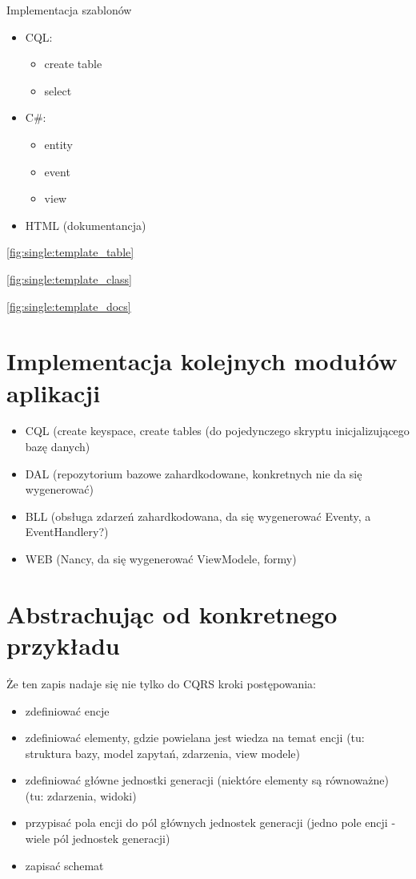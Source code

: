 Implementacja szablonów

\begin{itemize}
 \item CQL:
  \begin{itemize}
   \item create table
   \item select
  \end{itemize}
 \item C\#:
  \begin{itemize}
   \item entity
   \item event
   \item view
  \end{itemize}
 \item HTML (dokumentancja)
\end{itemize}

\ref{fig:single:template_table}


\ref{fig:single:template_class}


\ref{fig:single:template_docs}




\section{Implementacja kolejnych modułów aplikacji}

\begin{itemize}
 \item CQL (create keyspace, create tables (do pojedynczego skryptu inicjalizującego bazę danych)
 \item DAL (repozytorium bazowe zahardkodowane, konkretnych nie da się wygenerować)
 \item BLL (obsługa zdarzeń zahardkodowana, da się wygenerować Eventy, a EventHandlery?)
 \item WEB (Nancy, da się wygenerować ViewModele, formy)
\end{itemize}



\section{Abstrachując od konkretnego przykładu}

Że ten zapis nadaje się nie tylko do CQRS
kroki postępowania:

\begin{itemize}
 \item zdefiniować encje
 \item zdefiniować elementy, gdzie powielana jest wiedza na temat encji (tu: struktura bazy, model zapytań, zdarzenia, view modele)
 \item zdefiniować główne jednostki generacji (niektóre elementy są równoważne) (tu: zdarzenia, widoki)
 \item przypisać pola encji do pól głównych jednostek generacji (jedno pole encji - wiele pól jednostek generacji)
 \item zapisać schemat
\end{itemize}
